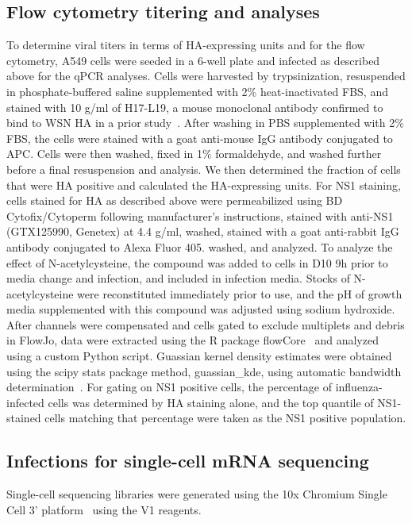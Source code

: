 \documentclass[9pt,lineno]{elife}
\begin{document}
\subsection{Flow cytometry titering and analyses}
To determine viral titers in terms of HA-expressing units and for the flow cytometry, A549 cells were seeded in a 6-well plate and infected as described above for the qPCR analyses.
Cells were harvested by trypsinization, resuspended in phosphate-buffered saline supplemented with 2\% heat-inactivated FBS, and stained with 10 \si{\micro}g/ml of H17-L19, a mouse monoclonal antibody confirmed to bind to WSN HA in a prior study~\citep{Doud:2017bw}.
After washing in PBS supplemented with 2\% FBS, the cells were stained with a goat anti-mouse IgG antibody conjugated to APC.
Cells were then washed, fixed in 1\% formaldehyde, and washed further before a final resuspension and analysis. 
We then determined the fraction of cells that were HA positive and calculated the HA-expressing units.
For NS1 staining, cells stained for HA as described above were permeabilized using BD Cytofix/Cytoperm following manufacturer's instructions, stained with anti-NS1 (GTX125990, Genetex) at 4.4 \si{\micro}g/ml, washed,  stained with a  goat anti-rabbit IgG antibody conjugated to Alexa Fluor 405. washed, and analyzed.
To analyze the effect of N-acetylcysteine, the compound was added to cells in D10 9h prior to media change and infection, and included in infection media.
Stocks of N-acetylcysteine were reconstituted immediately prior to use, and the pH of growth media supplemented with this compound was adjusted using sodium hydroxide.
After channels were compensated and cells gated to exclude multiplets and debris in FlowJo, data were extracted using the R package flowCore~\citep{LeMeur:2007uo} and analyzed using a custom Python script.
Guassian kernel density estimates were obtained using the scipy stats package method, guassian\_kde, using automatic bandwidth determination~\citep{vanderWalt:2017dp}.
For gating on NS1 positive cells, the percentage of influenza-infected cells was determined by HA staining alone, and the top quantile of NS1-stained cells matching that percentage were taken as the NS1 positive population.


\subsection{Infections for single-cell mRNA sequencing}
Single-cell sequencing libraries were generated using the 10x Chromium Single Cell 3' platform~\citep{zheng2017massively} using the V1 reagents.
\end{document}
